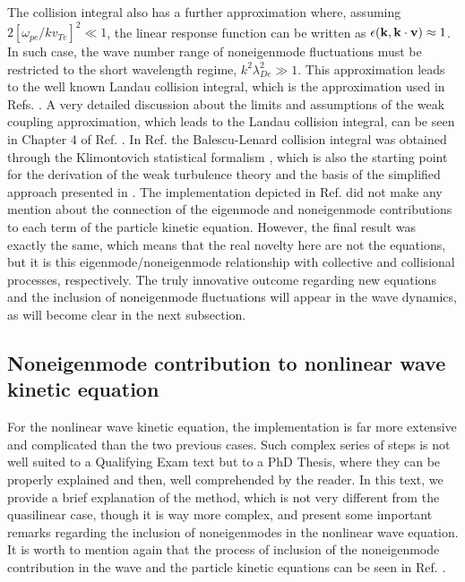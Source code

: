 \documentclass[12pt,a4paper,ruledheader]{report}
\begin{document}
The collision integral also has a further approximation where,
assuming $2[\omega_{pe}/kv_{Te}]^2\ll 1$, the linear response
function can be written as $\epsilon({\bf k},{\bf k \cdot v})
\approx 1$. In such case, the wave number range of noneigenmode
fluctuations must be restricted to the short wavelength regime,
$k^2\lambda_{De}^2\gg 1$. This approximation leads to the well
known Landau collision integral, which is the approximation used
in Refs. \cite{Tigik2016a,Tigik2017a}. A very detailed discussion
about the limits and assumptions of the weak coupling approximation,
which leads to the Landau collision integral,
 can be seen in Chapter
4 of Ref. \cite{Tigik2015}.
In Ref. \cite{Tigik2015} the Balescu-Lenard collision integral was
obtained through the Klimontovich statistical formalism
\cite{klimo,klimon}, which is also the starting point for
the derivation of the weak turbulence theory \cite{YZKS16} and the
basis of the simplified approach presented in .
The implementation depicted in Ref. \cite{Tigik2015} did not make
any mention about the connection of the eigenmode and noneigenmode
contributions to each term of the particle kinetic equation. However,
the final result was exactly the same, which means that
the real novelty
here are not the equations, but it is this eigenmode/noneigenmode
relationship with collective and collisional processes, respectively.
The truly innovative outcome regarding new equations and the inclusion
of noneigenmode fluctuations will appear in the wave dynamics, as will
become clear in the next subsection.


\subsection{Noneigenmode contribution to nonlinear wave
  kinetic equation}
For the nonlinear wave kinetic equation, the implementation
is far more extensive and complicated than the two previous
cases. Such complex series of steps is not well suited to a
Qualifying Exam text but to a PhD Thesis, where they can be
properly explained and then, well comprehended by the reader.
In this text, we provide a brief explanation of the method,
which is not very different from the quasilinear case, though
it is way more complex, and present some important remarks
regarding the inclusion of noneigenmodes in the nonlinear wave
equation. It is worth to mention again that the process of
inclusion of the noneigenmode contribution in the wave and the
particle kinetic equations can be seen in Ref. \cite{YZKS16}.
\end{document}
